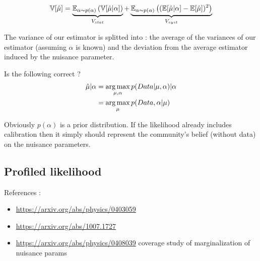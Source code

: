 \begin{equation}
\label{eq:stat_and_syst_variance_definition}
\mathbb{V}[\hat\mu] 
	= \underbrace{\mathbb{E}_{\alpha \sim p(\alpha)} \left (\mathbb{V}[\hat\mu | \alpha] \right )}_{V_{stat}} 
	+ \underbrace{\mathbb{E}_{\alpha \sim p(\alpha)} \left ( (\mathbb{E} [\hat\mu | \alpha]  - \mathbb{E}[\hat\mu])^2\right )}_{V_{syst}}
\end{equation}

The variance of our estimator is splitted into :
the average of the variances of our estimator (assuming $\alpha$ is known) and the deviation from the average estimator induced by the nuisance parameter.


Is the following correct ?
\begin{align}
	\hat\mu | \alpha &= \operatorname*{arg\,max}_{\mu, \alpha} p(Data | \mu, \alpha) | \alpha \\
		&= \operatorname*{arg\,max}_{\mu} p(Data , \alpha | \mu)
\end{align}

Obviously $p(\alpha)$ is a prior distribution.
If the likelihood already includes calibration then it simply should represent the community's belief (without data) on the nuisance parameters.





\subsection{Profiled likelihood} %
\label{sub:profiled_likelihood}




References : 
\begin{itemize}
	\item \url{https://arxiv.org/abs/physics/0403059}
	\item \url{https://arxiv.org/abs/1007.1727}
	\item \url{https://arxiv.org/abs/physics/0408039} coverage study of marginalization of nuisance params
\end{itemize}


